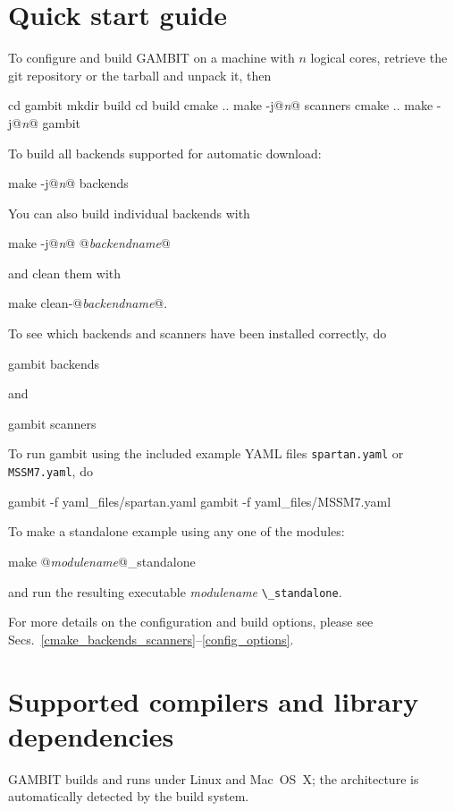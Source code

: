 \documentclass[pdftex,twocolumn,epjc3_preprint,runningheads]{svjour3}
\renewcommand{\_}{\discretionary{\underscore}{}{\underscore}}
\newcommand\term[1]{{\lstset{style=terminal}\lstinline!#1!\lstset{style=cpp}}}
\newcommand{\metavarf}[1]{\textit{\color{darkgreen}\footnotesize\textrm{#1}}}
\newcommand{\metavar}{\metavarf}
\newcommand{\gambit}{\textsf{GAMBIT}\xspace}
\newcommand{\GB}{\gambit}
\newcommand\YAML{\textsf{YAML}\xspace}
\begin{document}
\appendix

\section{Quick start guide}
\label{quickstart}
To configure and build \GB on a machine with $n$ logical cores, retrieve the git repository or the tarball and unpack it, then
\begin{lstterm}
cd gambit
mkdir build
cd build
cmake ..
make -j@\metavar{n}@ scanners
cmake ..
make -j@\metavar{n}@ gambit
\end{lstterm}
To build all backends supported for automatic download:
\begin{lstterm}
make -j@\metavar{n}@ backends
\end{lstterm}
You can also build individual backends with
\begin{lstterm}
make -j@\metavar{n}@ @\metavar{backend\_name}@
\end{lstterm}
and clean them with
\begin{lstterm}
make clean-@\metavar{backend\_name}@.
\end{lstterm}
To see which backends and scanners have been installed correctly, do
\begin{lstterm}
gambit backends
\end{lstterm}
and
\begin{lstterm}
gambit scanners
\end{lstterm}
To run gambit using the included example \YAML files \term{spartan.yaml} or \term{MSSM7.yaml}, do
\begin{lstterm}
gambit -f yaml_files/spartan.yaml
gambit -f yaml_files/MSSM7.yaml
\end{lstterm}
To make a standalone example using any one of the modules:
\begin{lstterm}
make @\metavar{module\_name}@_standalone
\end{lstterm}
and run the resulting executable \metavar{module\_name} \term{\_standalone}.

For more details on the configuration and build options, please see Secs.~\ref{cmake_backends_scanners}--\ref{config_options}.


\section{Supported compilers and library dependencies}
\label{dependencies}
\GB builds and runs under Linux and Mac~OS~X; the architecture is automatically detected by the build system.
\end{document}
